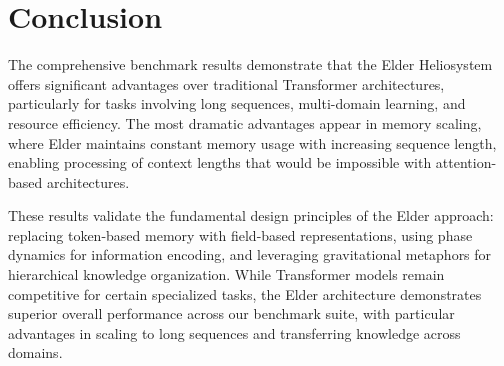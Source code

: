 \section{Conclusion}

The comprehensive benchmark results demonstrate that the Elder Heliosystem offers significant advantages over traditional Transformer architectures, particularly for tasks involving long sequences, multi-domain learning, and resource efficiency. The most dramatic advantages appear in memory scaling, where Elder maintains constant memory usage with increasing sequence length, enabling processing of context lengths that would be impossible with attention-based architectures.

These results validate the fundamental design principles of the Elder approach: replacing token-based memory with field-based representations, using phase dynamics for information encoding, and leveraging gravitational metaphors for hierarchical knowledge organization. While Transformer models remain competitive for certain specialized tasks, the Elder architecture demonstrates superior overall performance across our benchmark suite, with particular advantages in scaling to long sequences and transferring knowledge across domains.